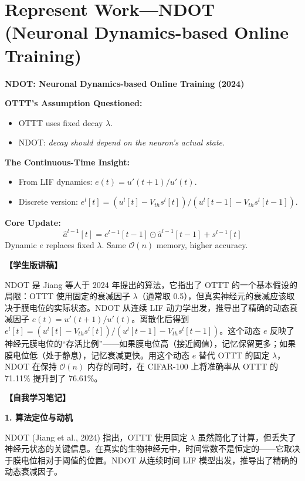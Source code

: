 \documentclass[journal,12pt,onecolumn]{IEEEtran}
\begin{document}
\section{Represent Work—NDOT (Neuronal Dynamics-based Online Training)}

\bigskip\noindent\textbf{NDOT: Neuronal Dynamics-based Online Training (2024)}\par\smallskip
\textbf{OTTT's Assumption Questioned:}
\begin{itemize}
    \item OTTT uses fixed decay $\lambda$.
    \item NDOT: \textit{decay should depend on the neuron's actual state.}
\end{itemize}
\textbf{The Continuous-Time Insight:}
\begin{itemize}
    \item From LIF dynamics: $e(t) = u'(t+1)/u'(t)$.
    \item Discrete version: $e^l[t] = (u^l[t] - V_{th}s^l[t])/(u^l[t-1] - V_{th}s^l[t-1])$.
\end{itemize}
\textbf{Core Update:}
\begin{equation}
    \hat{a}^{l-1}[t] = e^{l-1}[t-1] \odot \hat{a}^{l-1}[t-1] + s^{l-1}[t]
\end{equation}
Dynamic $e$ replaces fixed $\lambda$. Same $\mathcal{O}(n)$ memory, higher accuracy.

\textbf{【学生版讲稿】}

NDOT 是 Jiang 等人于 2024 年提出的算法，它指出了 OTTT 的一个基本假设的局限：OTTT 使用固定的衰减因子 $\lambda$（通常取 0.5），但真实神经元的衰减应该取决于膜电位的实际状态。NDOT 从连续 LIF 动力学出发，推导出了精确的动态衰减因子 $e(t) = u'(t+1)/u'(t)$。离散化后得到 $e^l[t] = (u^l[t] - V_{th}s^l[t])/(u^l[t-1] - V_{th}s^l[t-1])$。这个动态 $e$ 反映了神经元膜电位的“存活比例”——如果膜电位高（接近阈值），记忆保留更多；如果膜电位低（处于静息），记忆衰减更快。用这个动态 $e$ 替代 OTTT 的固定 $\lambda$，NDOT 在保持 $\mathcal{O}(n)$ 内存的同时，在 CIFAR-100 上将准确率从 OTTT 的 71.11\% 提升到了 76.61\%。

\bigskip\noindent\textbf{【自我学习笔记】}

\medskip\noindent\textbf{1. 算法定位与动机}

NDOT (Jiang et al., 2024) 指出，OTTT 使用固定 $\lambda$ 虽然简化了计算，但丢失了神经元状态的关键信息。在真实的生物神经元中，时间常数不是恒定的——它取决于膜电位相对于阈值的位置。NDOT 从连续时间 LIF 模型出发，推导出了精确的动态衰减因子。
\end{document}
